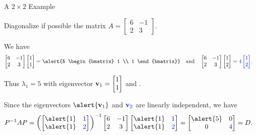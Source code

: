 \documentclass[xcolor=dvipsnames,aspectratio=169,t]{beamer}
\begin{document}
\begin{frame}{A $2 \times 2$ Example}
  \bigskip

  Diagonalize if possible the matrix $A = \begin{bmatrix} 6 & -1 \\ 2 & 3 \end{bmatrix}$.
  \bigskip
  
  \pause
  We have
  \[ \begin{bmatrix} 6 & -1 \\ 2 & 3 \end{bmatrix} \begin{bmatrix} 1 \\ 1 \end{bmatrix} = \alert{5 \begin{bmatrix} 1 \\ 1 \end{bmatrix}} \quad \mbox{and} \quad  \begin{bmatrix} 6 & -1 \\ 2 & 3 \end{bmatrix} \begin{bmatrix} 1 \\ 2 \end{bmatrix} = \colorb{4 \begin{bmatrix} 1 \\ 2 \end{bmatrix}}. \]
  \medskip

  Thus \alert{$\lambda_1 = 5$ with eigenvector $\mathbf{v}_1 = \begin{bmatrix} 1 \\ 1 \end{bmatrix}$} and .
  \bigskip
  
  \pause
  Since the eigenvectors $\alert{\v_1}$ and $\textcolor{blue}{\mathbf{v}_2}$ are linearly independent, we have
  \[ P^{-1}AP=
  \left( \begin{bmatrix} \alert{1} & \colorb{1} \\ \alert{1} & \colorb{2} \end{bmatrix} \right)^{-1} 
  \begin{bmatrix}6 & -1 \\ 2 & 3 \end{bmatrix} 
  \begin{bmatrix} \alert{1} & \colorb{1} \\ \alert{1} & \colorb{2} \end{bmatrix} 
  = 
  \begin{bmatrix} \alert{5} & 0 \\ 0 & \colorb{4} \end{bmatrix} 
  = D. \]
  

\end{frame}
\end{document}
